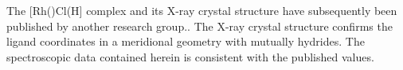 The [Rh(\tBuxantphos)Cl(H] complex and its X-ray crystal structure have subsequently been published by another research group.\cite{Haibach2013}.  The X-ray crystal structure confirms the \tBuxantphos{} ligand coordinates in a \POP{} meridional geometry with mutually \cis{} hydrides.  The spectroscopic data contained herein is consistent with the published values.  



